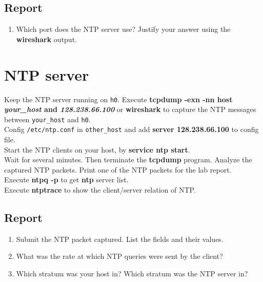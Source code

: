 \documentclass[10pt,a4paper]{article}
\numberwithin{equation}{section}
\numberwithin{figure}{section}
\numberwithin{table}{section}
\begin{document}
    \subsection*{Report}
    \begin{enumerate}
        \item Which port does the NTP server use?
        Justify your answer using the \textbf{wireshark} output.
    \end{enumerate}

\section{NTP server}
    Keep the NTP server running on \texttt{h0}. Execute \textbf{tcpdump -exn -nn host \textit{your\_host} and \textit{128.238.66.100}} or \textbf{wireshark} to capture the NTP messages between \texttt{your\_host} and \texttt{h0}.\\
    Config \texttt{/etc/ntp.conf} in \texttt{other\_host} and add \textbf{server 128.238.66.100} to config file.\\
    Start the NTP clients on your host, by \textbf{service ntp start}.\\
    Wait for several minutes. Then terminate the \textbf{tcpdump} program. Analyze the captured NTP packets. Print one of the NTP packets for the lab report.\\
    Execute \textbf{ntpq -p} to get \textbf{ntp} server list.\\
    Execute \textbf{ntptrace} to show the client/server relation of NTP.\\

    \subsection*{Report}
    \begin{enumerate}
        \item Submit the NTP packet captured. List the fields and their values.
        \item What was the rate at which NTP queries were sent by the client?
        \item Which stratum was your host in? Which stratum was the NTP server in?
    \end{enumerate}
\end{document}
